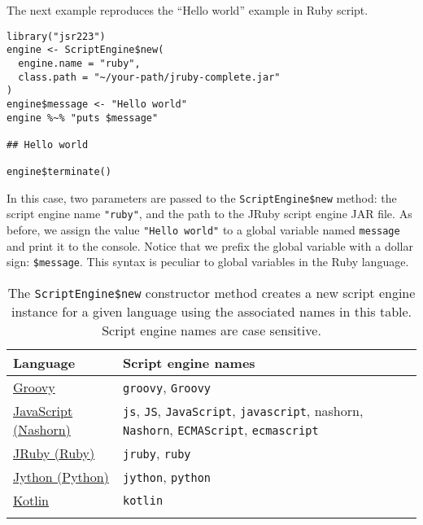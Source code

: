 \documentclass[
article,
11pt, %
a4paper, %
oneside, %
headinclude,footinclude, %
]{scrartcl}
\theoremstyle{definition} %
\theoremstyle{plain} %
\theoremstyle{remark} %
\newcommand{\code}[1]{\texttt{#1}}
\begin{document}
The next example reproduces the “Hello world” example in Ruby script.

\begin{verbatim}
library("jsr223")
engine <- ScriptEngine$new(
  engine.name = "ruby",
  class.path = "~/your-path/jruby-complete.jar"
)
engine$message <- "Hello world"
engine %~% "puts $message"

## Hello world

engine$terminate()
\end{verbatim}
In this case, two parameters are passed to the \code{ScriptEngine\$new} method: the script engine name \code{"ruby"}, and the path to the JRuby script engine JAR file. As before, we assign the value \code{"Hello world"} to a global variable named \code{message} and print it to the console. Notice that we prefix the global variable with a dollar sign: \code{\$message}. This syntax is peculiar to global variables in the Ruby language.

\begin{table}[h]
    \small
    \centering
    \begin{tabular}{l p{8cm}}
        \toprule
        \textbf{Language} & \textbf{Script engine names} \\
        \midrule
        \noalign{\vspace{1ex}}
        \href{http://groovy-lang.org}{Groovy} &  \code{groovy}, \code{Groovy}\\[.25cm]
        \href{https://docs.oracle.com/javase/8/docs/technotes/guides/scripting/nashorn/}{JavaScript (Nashorn)} & \code{js}, \code{JS}, \code{JavaScript}, \code{javascript}, {nashorn}, \code{Nashorn}, \code{ECMAScript}, \code{ecmascript}\\[.25cm]
        \href{http://jruby.org}{JRuby (Ruby)} & \code{jruby}, \code{ruby}\\[.25cm]
        \href{http://www.jython.org}{Jython (Python)} & \code{jython}, \code{python}\\[.25cm]
        \href{https://kotlinlang.org/}{Kotlin} & \code{kotlin}\\
        \noalign{\vspace{1ex}}
        \bottomrule
    \end{tabular}
    \caption{The \code{ScriptEngine\$new} constructor method creates a new script engine instance for a given language using the associated names in this table. Script engine names are case sensitive.}
    \label{tab:script-engine-type-names}
\end{table}
\end{document}
